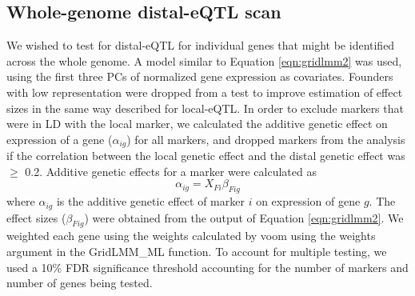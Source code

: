 \documentclass[article,9pt,twocolumn,twoside]{rilabRxiv}
\begin{document}
\subsection{Whole-genome distal-eQTL scan}
We wished to test for distal-eQTL for individual genes that might be identified across the whole genome.
A model similar to Equation \ref{eqn:gridlmm2} was used, using the first three PCs of normalized gene expression as covariates.
Founders with low representation were dropped from a test to improve estimation of effect sizes in the same way described for local-eQTL.
In order to exclude markers that were in LD with the local marker, we calculated the additive genetic effect on expression of a gene ($\alpha_{ig}$) for all markers, and dropped markers from the analysis if the correlation between the local genetic effect and the distal genetic effect was $\ge$ 0.2.
Additive genetic effects for a marker were calculated as
    \begin{equation}
    \label{eqn:bvs}
    \alpha_{ig} = X_{Fi}{\beta_{Fig}}
    \end{equation}
    where $\alpha_{ig}$ is the additive genetic effect of marker $i$ on expression of gene $g$.
The effect sizes ($\beta_{Fig}$) were obtained from the output of Equation \ref{eqn:gridlmm2}.
We weighted each gene using the weights calculated by voom using the weights argument in the GridLMM\_ML function.
To account for multiple testing, we used a 10\% FDR significance threshold accounting for the number of markers and number of genes being tested.
\end{document}
